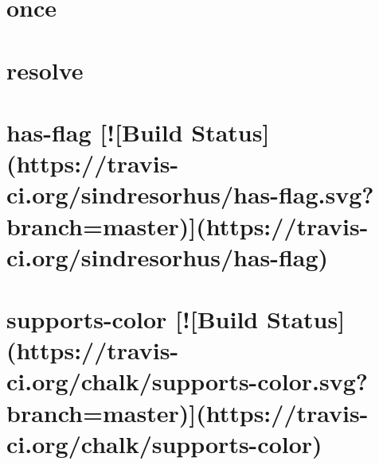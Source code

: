 \documentclass[twoside]{book}
\newcommand{\+}{\discretionary{\mbox{\scriptsize$\hookleftarrow$}}{}{}}
\begin{document}
\chapter{once}
\label{md__c_1__users_martin__documents__git_hub_visual_studio__bachelor__wis_r__wis_r_node_modules_iste4e128975e636ae9b4e7c7ad4d7efd68}
\hypertarget{md__c_1__users_martin__documents__git_hub_visual_studio__bachelor__wis_r__wis_r_node_modules_iste4e128975e636ae9b4e7c7ad4d7efd68}{}

\chapter{resolve}
\label{md__c_1__users_martin__documents__git_hub_visual_studio__bachelor__wis_r__wis_r_node_modules_ist860a67098969a04f0681930c8ffaa0b5}
\hypertarget{md__c_1__users_martin__documents__git_hub_visual_studio__bachelor__wis_r__wis_r_node_modules_ist860a67098969a04f0681930c8ffaa0b5}{}

\chapter{has-\/flag \mbox{[}!\mbox{[}Build Status\mbox{]}(https\+://travis-\/ci.org/sindresorhus/has-\/flag.svg?branch=master)\mbox{]}(https\+://travis-\/ci.org/sindresorhus/has-\/flag)}
\label{md__c_1__users_martin__documents__git_hub_visual_studio__bachelor__wis_r__wis_r_node_modules_ist49e39b1735741af01e1a307c2364475a}
\hypertarget{md__c_1__users_martin__documents__git_hub_visual_studio__bachelor__wis_r__wis_r_node_modules_ist49e39b1735741af01e1a307c2364475a}{}

\chapter{supports-\/color \mbox{[}!\mbox{[}Build Status\mbox{]}(https\+://travis-\/ci.org/chalk/supports-\/color.svg?branch=master)\mbox{]}(https\+://travis-\/ci.org/chalk/supports-\/color)}
\label{md__c_1__users_martin__documents__git_hub_visual_studio__bachelor__wis_r__wis_r_node_modules_ist6a102f113b103524d4157036f76e6d9a}
\hypertarget{md__c_1__users_martin__documents__git_hub_visual_studio__bachelor__wis_r__wis_r_node_modules_ist6a102f113b103524d4157036f76e6d9a}{}

\end{document}
